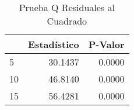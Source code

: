 \begin{table}[H]
\label{tab:q_test_resid2}
\centering
\begin{tabular}{lrr}
\toprule
 & Estad\'istico & P-Valor \\
\midrule
5 & 30.1437 & 0.0000 \\
10 & 46.8140 & 0.0000 \\
15 & 56.4281 & 0.0000 \\
\bottomrule
\end{tabular}
\caption{Prueba Q Residuales al Cuadrado}
\end{table}
